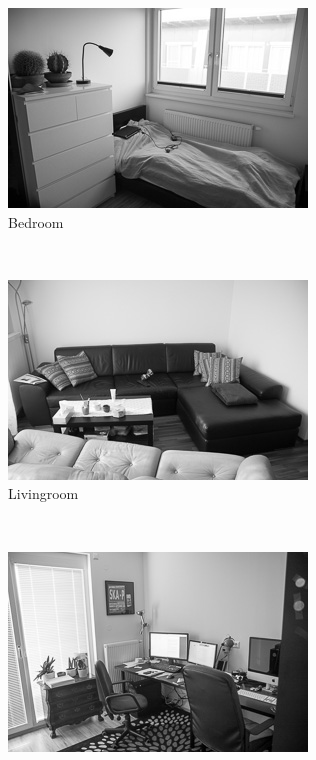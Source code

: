 \documentclass[subfigure,epsfig,fleqn,float,numbers=noenddot]{scrartcl}
\begin{document}
\begin{figure}
        \centering
        \begin{subfigure}[b]{0.3\textwidth}
                \includegraphics[width=\textwidth]{img/own/bedroom}
                \caption{Bedroom}
                \label{fig:bedroom}
        \end{subfigure}%
        ~
        \begin{subfigure}[b]{0.3\textwidth}
                \includegraphics[width=\textwidth]{img/own/livingroom}
                \caption{Livingroom}
                \label{fig:livingroom}
        \end{subfigure}
        ~
        \begin{subfigure}[b]{0.3\textwidth}
                \includegraphics[width=\textwidth]{img/own/office}

\end{subfigure}
\end{figure}
\end{document}
